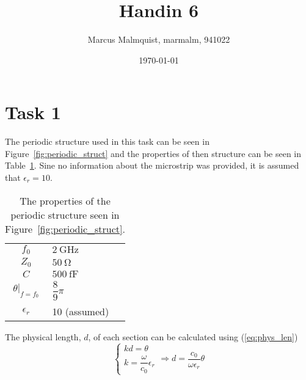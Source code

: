 \documentclass[12pt,a4paper]{article}
\title{Handin 6}
\author{Marcus Malmquist, marmalm, 941022}
\date{\today}
\begin{document}
\maketitle

\section{Task 1}\label{sec:1}
The periodic structure used in this task can be seen in Figure~\ref{fig:periodic_struct} and the properties of then structure can be seen in Table~\ref{tab:props}. Sine no information about the microstrip was provided, it is assumed that $\epsilon_r=10$.

\begin{table}
  \centering
  \begin{tabular}{|c|l|} \hline
    $f_0$ & $\SI{2}{\giga\hertz}$ \\
    $Z_0$ & $\SI{50}{\ohm}$ \\
    $C$ & $\SI{500}{\femto\farad}$ \\
    $\left. \theta\right|_{f=f_0}$ & $\dfrac{8}{9}\pi$ \\
    $\epsilon_r$ & 10 (assumed) \\ \hline
  \end{tabular}
  \caption{The properties of the periodic structure seen in Figure~\ref{fig:periodic_struct}.}
  \label{tab:props}
\end{table}

The physical length, $d$, of each section can be calculated using (\ref{eq:phys_len})
\begin{equation}
  \label{eq:phys_len}
  \begin{cases}
    kd = \theta \\
    k = \dfrac{\omega}{c_0}\epsilon_r
  \end{cases}
  \Rightarrow d = \frac{c_0}{\omega\epsilon_r}\theta
\end{equation}
\end{document}
